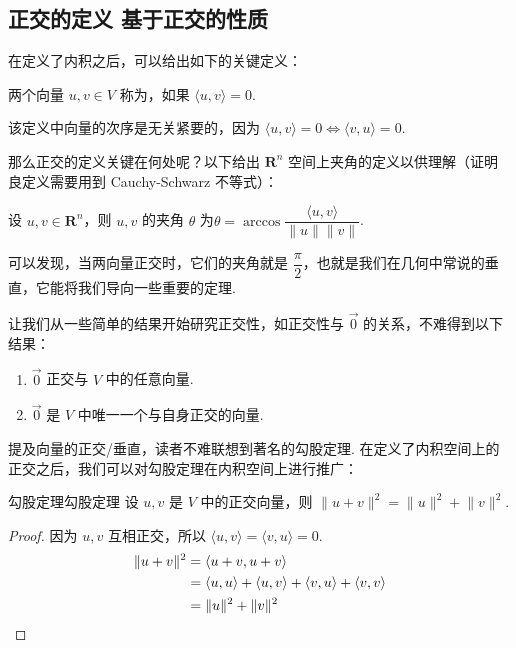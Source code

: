 \subsection{正交的定义 \quad 基于正交的性质}

在定义了内积之后，可以给出如下的关键定义：

\begin{definition}{}{}
    两个向量 $u, v \in V$ 称为，如果 $\langle u, v\rangle = 0$.
\end{definition}

该定义中向量的次序是无关紧要的，因为 $\langle u, v\rangle = 0 \iff \langle v, u\rangle = 0$.

那么正交的定义关键在何处呢？以下给出 $\mathbf{R}^{n}$ 空间上夹角的定义以供理解（证明良定义需要用到 Cauchy-Schwarz 不等式）：

\begin{definition}{}{}
    设 $u, v \in \mathbf{R}^{n}$，则 $u, v$ 的夹角 $ \theta $ 为$ \theta = \arccos \dfrac{\langle u, v\rangle}{\lVert u \rVert \lVert v \rVert}$.
\end{definition}

可以发现，当两向量正交时，它们的夹角就是 $\dfrac{\pi}{2}$，也就是我们在几何中常说的垂直，它能将我们导向一些重要的定理.

让我们从一些简单的结果开始研究正交性，如正交性与 $ \vec{0} $ 的关系，不难得到以下结果：

\begin{enumerate}
    \item $ \vec{0} $ 正交与 $V$ 中的任意向量.

    \item $ \vec{0} $ 是 $V$ 中唯一一个与自身正交的向量.
\end{enumerate}

提及向量的正交/垂直，读者不难联想到著名的勾股定理. 在定义了内积空间上的正交之后，我们可以对勾股定理在内积空间上进行推广：

\begin{theorem}{勾股定理}{勾股定理}
    设 $u, v$ 是 $V$ 中的正交向量，则 $\lVert u + v \rVert^2 = \lVert u \rVert^2 + \lVert v \rVert^2 $.
\end{theorem}

\begin{proof}
    因为 $u, v$ 互相正交，所以 $\langle u, v \rangle = \langle v, u \rangle = 0$.
    \begin{align*}
        \lVert u + v \rVert^2 & = \langle u + v, u + v \rangle \\
                              & = \langle u, u \rangle + \langle u, v \rangle + \langle v, u \rangle + \langle v, v \rangle \\
                              & = \lVert u \rVert^2 + \lVert v \rVert^2 \qedhere
    \end{align*}
\end{proof}

